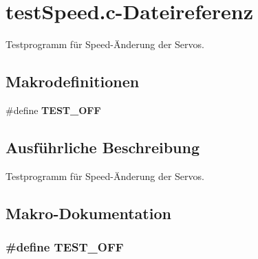 \section{testSpeed.c-\/Dateireferenz}
\label{test_speed_8c}


Testprogramm für Speed-\/Änderung der Servos.  


\subsection*{Makrodefinitionen}
\begin{DoxyCompactItemize}
\item 
\#define {\bf TEST\_\-OFF}
\end{DoxyCompactItemize}


\subsection{Ausführliche Beschreibung}
Testprogramm für Speed-\/Änderung der Servos. 

\subsection{Makro-\/Dokumentation}
\subsubsection[{TEST\_\-OFF}]{\setlength{\rightskip}{0pt plus 5cm}\#define TEST\_\-OFF}\label{test_speed_8c_a8f6764e8e57eabbb14922404c0e25175}
